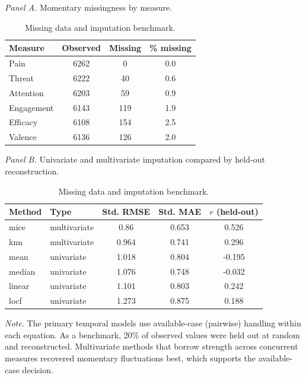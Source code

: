 \begin{table}[!htbp]
\raggedright
\caption{Missing data and imputation benchmark.}
\label{tab:sup-imputation}
\footnotesize
\begingroup
\setlength{\tabcolsep}{4pt}
\renewcommand{\arraystretch}{1.08}
\noindent\textit{Panel A.} Momentary missingness by measure.\par\vspace{2pt}
\begin{tabular*}{\textwidth}{@{\extracolsep{\fill}}lccc@{}}
\toprule
Measure & Observed & Missing & \% missing \\
\midrule
Pain & 6262 & 0 & 0.0 \\
Threat & 6222 & 40 & 0.6 \\
Attention & 6203 & 59 & 0.9 \\
Engagement & 6143 & 119 & 1.9 \\
Efficacy & 6108 & 154 & 2.5 \\
Valence & 6136 & 126 & 2.0 \\
\bottomrule
\end{tabular*}
\par\vspace{6pt}\noindent\textit{Panel B.} Univariate and multivariate imputation compared by held-out reconstruction.\par\vspace{2pt}
\begin{tabular*}{\textwidth}{@{\extracolsep{\fill}}llccc@{}}
\toprule
Method & Type & Std. RMSE & Std. MAE & $r$ (held-out) \\
\midrule
mice & multivariate & 0.86 & 0.653 & 0.526 \\
knn & multivariate & 0.964 & 0.741 & 0.296 \\
mean & univariate & 1.018 & 0.804 & -0.195 \\
median & univariate & 1.076 & 0.748 & -0.032 \\
linear & univariate & 1.101 & 0.803 & 0.242 \\
locf & univariate & 1.273 & 0.875 & 0.188 \\
\bottomrule
\end{tabular*}
\par\vspace{3pt}\noindent\parbox{\textwidth}{\footnotesize\textit{Note.} The primary temporal models use available-case (pairwise) handling within each equation. As a benchmark, 20\% of observed values were held out at random and reconstructed. Multivariate methods that borrow strength across concurrent measures recovered momentary fluctuations best, which supports the available-case decision.}
\endgroup
\end{table}
